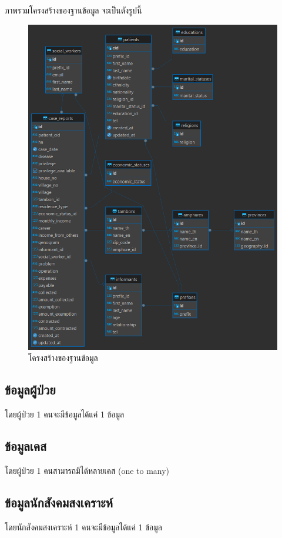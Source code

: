 ภาพรวมโครงสร้างของฐานข้อมูล จะเป็นดังรูปนี้

\begin{figure}[H]
  \begin{center}
  \includegraphics[width=1\textwidth]{481858458_4043514635914838_3135881775907933051_n.png}
  \end{center}
  \caption[โครงสร้างของฐานข้อมูล]{โครงสร้างของฐานข้อมูล}
\end{figure}
\newpage

\subsection{ข้อมูลผู้ป่วย}
โดยผู้ป่วย 1 คนจะมีข้อมูลได้แค่ 1 ข้อมูล
\subsection{ข้อมูลเคส}
โดยผู้ป่วย 1 คนสามารถมีได้หลายเคส (one to many)
\subsection{ข้อมูลนักสังคมสงเคราะห์}
โดยนักสังคมสงเคราะห์ 1 คนจะมีข้อมูลได้แค่ 1 ข้อมูล
